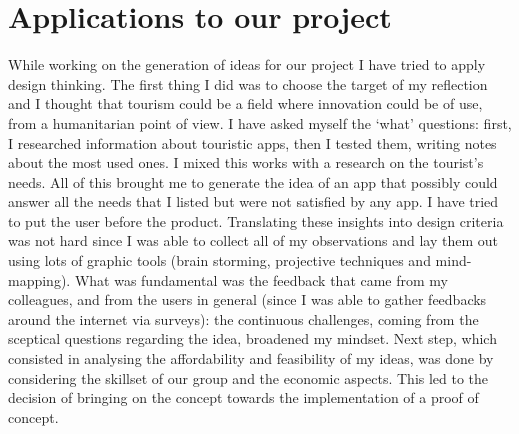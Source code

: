 \documentclass[a4paper,9pt]{article}
\begin{document}
\section{Applications to our project}
While working on the generation of ideas for our project I have tried to apply design thinking. The first thing I did was to choose the target of my reflection and I thought that tourism could be a field where innovation could be of use, from a humanitarian point of view. I have asked myself the ‘what’ questions: first, I researched information about touristic apps, then I tested them, writing notes about the most used ones. I mixed this works with a research on the tourist’s needs. All of this brought me to generate the idea of an app that possibly could answer all the needs that I listed but were not satisfied by any app. I have tried to put the user before the product. Translating these insights into design criteria was not hard since I was able to collect all of my observations and lay them out using lots of graphic tools (brain storming, projective techniques and mind-mapping). What was fundamental was the feedback that came from my colleagues, and from the users in general (since I was able to gather feedbacks around the internet via surveys): the continuous challenges, coming from the sceptical questions regarding the idea, broadened my mindset. Next step, which consisted in analysing the affordability and feasibility of my ideas, was done by considering the skillset of our group and the economic aspects. This led to the decision of bringing on the concept towards the implementation of a proof of concept.
\end{document}
